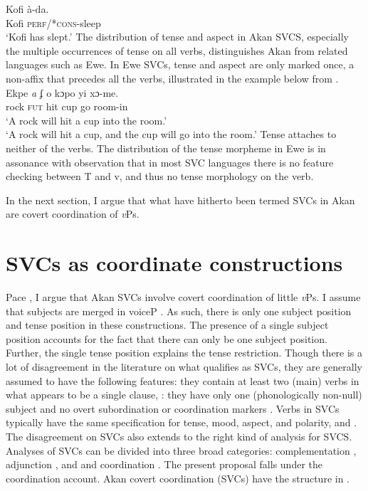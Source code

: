 \documentclass[output=paper,colorlinks,citecolor=brown]{langscibook}
\begin{document}
\ea \label{ex8}
 \gll Kofi à-da.\\
	Kofi \textsc{perf}/*\textsc{cons}-sleep\\
	\glt `Kofi has slept.'
\z The distribution of tense and aspect in Akan SVCS, especially the multiple occurrences of tense on all verbs, distinguishes Akan from related languages such as Ewe. In Ewe SVCs, tense and aspect are only marked once, a non-affix that precedes all the verbs, illustrated in the example below from \cite{Collins1997}.
\ea \label{ex0)} 
 \\
\gll Ekpe \textit{a} ʄ o kɔpo yi xɔ-me.\\
rock {\textsc{fut}} hit cup go room-in\\
\glt `A rock will hit a cup into the room.'\\
`A rock will hit a cup, and the cup will go into the room.' 
\z Tense attaches to neither of the verbs. The distribution of the tense morpheme in Ewe is in assonance with  observation that in most SVC languages there is no feature checking between T and v, and thus no tense morphology on the verb.

In the next section, I argue that what have hitherto been termed SVCs in Akan are covert coordination of \emph{v}Ps.

\section{SVCs as coordinate constructions}\label{sec:owusu:3}
Pace \citet{Martin2011}, I argue that Akan SVCs involve covert coordination of little \emph{v}Ps. I assume that subjects are merged in voiceP \citep{Kratzer1996}. As such, there is only one subject position and tense position in these constructions. The presence of a single subject position accounts for the fact that there can only be one subject position.  Further, the single tense position explains the tense restriction. Though there is a lot of disagreement in the literature on what qualifies as SVCs, they are generally assumed to have the following features: they contain at least two (main) verbs in what appears to be a single clause, \citep{Veenstra1993}: they have only one (phonologically non-null) subject and no overt subordination or coordination markers \citep{JansenEtAl1978,Sebba1987}. Verbs in SVCs typically have the same specification for tense, mood, aspect, and polarity, \citep{Baker1989} and \citep{Collins1997}. The disagreement on SVCs also extends to the right kind of analysis for SVCS. Analyses of SVCs can be divided into three broad categories: complementation \citep{Baker1989, BakerStewart2002, Collins1997, Aboh2009}, adjunction \citep{BakerStewart2002}, and and coordination \citep{Agbedor1994}. The present proposal falls under the coordination account. Akan covert coordination (SVCs) have the structure in .
\end{document}
